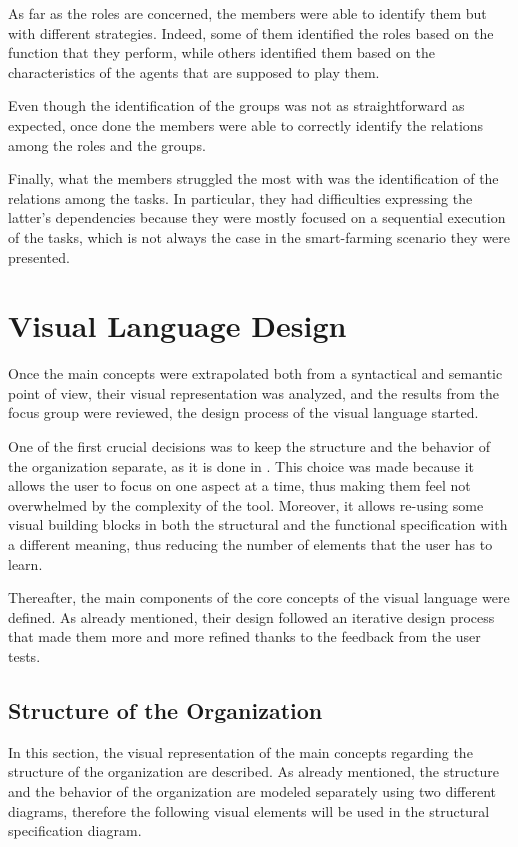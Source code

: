 As far as the roles are concerned, the members were able to identify them but with different strategies.
Indeed, some of them identified the roles based on the function that they perform, while others identified them based on the characteristics of the agents that are supposed to play them.

Even though the identification of the groups was not as straightforward as expected, once done the members were able to correctly identify the relations among the roles and the groups.

Finally, what the members struggled the most with was the identification of the relations among the tasks.
In particular, they had difficulties expressing the latter's dependencies because they were mostly focused on a sequential execution of the tasks, which is not always the case in the smart-farming scenario they were presented.

\section{Visual Language Design}
Once the main concepts were extrapolated both from a syntactical and semantic point of view, their visual representation was analyzed, and the results from the focus group were reviewed, the design process of the visual language started.

One of the first crucial decisions was to keep the structure and the behavior of the organization separate, as it is done in \moise{}.
This choice was made because it allows the user to focus on one aspect at a time, thus making them feel not overwhelmed by the complexity of the tool.
Moreover, it allows re-using some visual building blocks in both the structural and the functional specification with a different meaning, thus reducing the number of elements that the user has to learn.

Thereafter, the main components of the core concepts of the visual language were defined.
As already mentioned, their design followed an iterative design process that made them more and more refined thanks to the feedback from the user tests.

\subsection{Structure of the Organization}
In this section, the visual representation of the main concepts regarding the structure of the organization are described.
As already mentioned, the structure and the behavior of the organization are modeled separately using two different diagrams, therefore the following visual elements will be used in the structural specification diagram.

